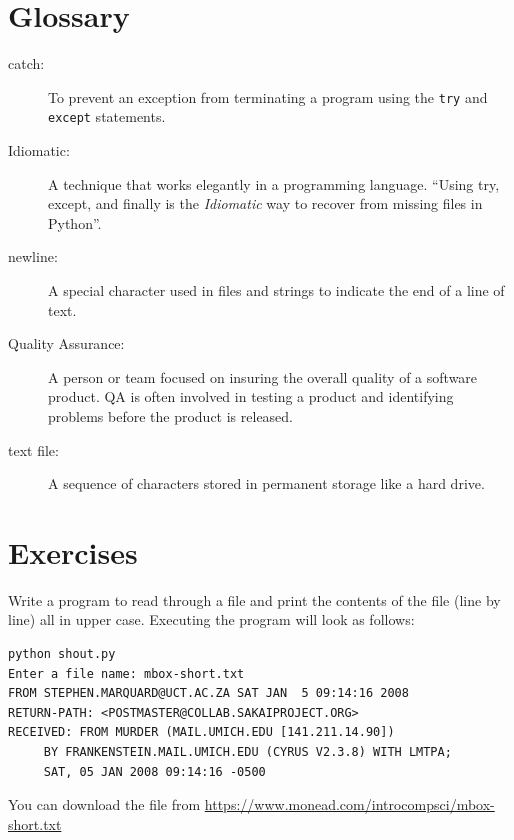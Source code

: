 
\section{Glossary}

\begin{description}

\item[catch:] To prevent an exception from terminating
a program using the {\tt try} and {\tt except} statements.

\item[Idiomatic:] A technique that works elegantly in a programming language.
``Using try, except, and finally is the \emph{Idiomatic} way to recover from 
missing files in Python''.

\item[newline:] A special character used in files and strings to indicate
the end of a line of text.

\item[Quality Assurance:] A person or team focused on insuring the 
overall quality of a software product.  QA is often involved 
in testing a product and identifying problems before the product 
is released.

\item[text file:] A sequence of characters stored in permanent
storage like a hard drive.

\end{description}


\section{Exercises}

\begin{ex}
Write a program to read through a file and print the contents 
of the file (line by line) all in upper case.  Executing the program 
will look as follows:

\beforeverb
\begin{verbatim}
python shout.py
Enter a file name: mbox-short.txt
FROM STEPHEN.MARQUARD@UCT.AC.ZA SAT JAN  5 09:14:16 2008
RETURN-PATH: <POSTMASTER@COLLAB.SAKAIPROJECT.ORG>
RECEIVED: FROM MURDER (MAIL.UMICH.EDU [141.211.14.90])
	 BY FRANKENSTEIN.MAIL.UMICH.EDU (CYRUS V2.3.8) WITH LMTPA;
	 SAT, 05 JAN 2008 09:14:16 -0500
\end{verbatim}
\afterverb
%
You can download the file from
\url{https://www.monead.com/introcompsci/mbox-short.txt}
\end{ex}

